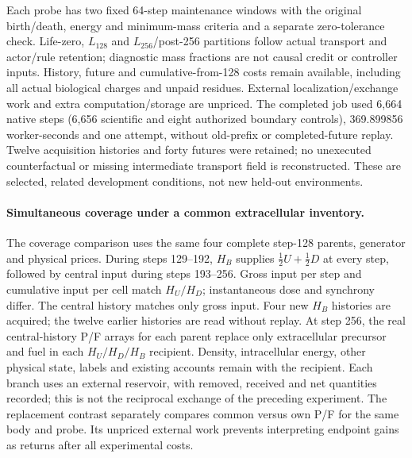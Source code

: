 Each probe has two fixed 64-step maintenance windows with the original birth/death, energy and minimum-mass criteria and a separate zero-tolerance check. Life-zero, $L_{128}$ and $L_{256}$/post-256 partitions follow actual transport and actor/rule retention; diagnostic mass fractions are not causal credit or controller inputs. History, future and cumulative-from-128 costs remain available, including all actual biological charges and unpaid residues. External localization/exchange work and extra computation/storage are unpriced. The completed job used 6,664 native steps (6,656 scientific and eight authorized boundary controls), 369.899856 worker-seconds and one attempt, without old-prefix or completed-future replay. Twelve acquisition histories and forty futures were retained; no unexecuted counterfactual or missing intermediate transport field is reconstructed. These are selected, related development conditions, not new held-out environments.

\paragraph{Simultaneous coverage under a common extracellular inventory.}
The coverage comparison uses the same four complete step-128 parents, generator and physical prices. During steps 129--192, $H_B$ supplies $\tfrac12 U+\tfrac12 D$ at every step, followed by central input during steps 193--256. Gross input per step and cumulative input per cell match $H_U/H_D$; instantaneous dose and synchrony differ. The central history matches only gross input. Four new $H_B$ histories are acquired; the twelve earlier histories are read without replay. At step 256, the real central-history P/F arrays for each parent replace only extracellular precursor and fuel in each $H_U/H_D/H_B$ recipient. Density, intracellular energy, other physical state, labels and existing accounts remain with the recipient. Each branch uses an external reservoir, with removed, received and net quantities recorded; this is not the reciprocal exchange of the preceding experiment. The replacement contrast separately compares common versus own P/F for the same body and probe. Its unpriced external work prevents interpreting endpoint gains as returns after all experimental costs.

